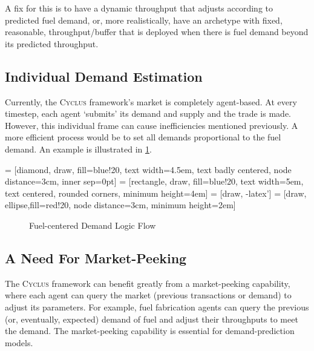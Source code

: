 \documentclass{article}
\newcommand{\Cyclus}{\textsc{Cyclus}\xspace}%
\begin{document}
A fix for this is to have a dynamic throughput that adjusts according
to predicted fuel demand, or, more realistically, have an archetype with fixed, reasonable, throughput/buffer
that is deployed when there is fuel demand beyond its predicted throughput.

\subsection{Individual Demand Estimation}
Currently, the \Cyclus framework's market is completely agent-based. At every timestep, each agent `submits' its
demand and supply and the trade is made. However, this individual frame can cause inefficiencies mentioned previously.
A more efficient process would be to set all demands proportional to the fuel demand. An example is illustrated
in \cref{diag:hd}.

 = [diamond, draw, fill=blue!20, 
text width=4.5em, text badly centered, node distance=3cm, inner sep=0pt]
 = [rectangle, draw, fill=blue!20, 
text width=5em, text centered, rounded corners, minimum height=4em]
 = [draw, -latex']
 = [draw, ellipse,fill=red!20, node distance=3cm,
minimum height=2em]


\begin{figure}
	\centering
	\caption{Fuel-centered Demand Logic Flow}
	\label{diag:hd}
\end{figure}
 

\subsection{A Need For Market-Peeking}
The \Cyclus framework can benefit greatly from a market-peeking capability,
where each agent can query the market (previous transactions or demand) to adjust its parameters. For example, fuel fabrication
agents can query the previous (or, eventually, expected) demand of fuel and adjust their throughputs to meet the demand. 
The market-peeking capability is essential for demand-prediction models.
\end{document}
